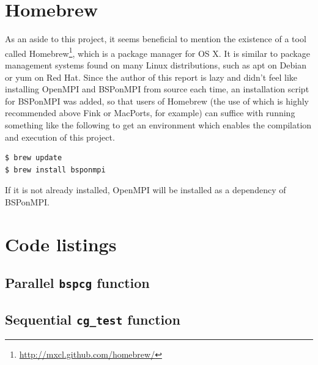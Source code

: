 \documentclass[a4paper]{article}
\begin{document}
\clearpage
\section{Homebrew}

As an aside to this project, it seems beneficial to mention the existence of a
tool called Homebrew\footnote{\url{http://mxcl.github.com/homebrew/}}, which is
a package manager for OS X. It is similar to package management systems found
on many Linux distributions, such as apt on Debian or yum on Red Hat. Since the
author of this report is lazy and didn't feel like installing OpenMPI and
BSPonMPI from source each time, an installation script for BSPonMPI was added,
so that users of Homebrew (the use of which is highly recommended above Fink or MacPorts,
for example) can suffice with running something like the following to get an
environment which enables the compilation and execution of this project.

\begin{verbatim}
$ brew update
$ brew install bsponmpi
\end{verbatim}

If it is not already installed, OpenMPI will be installed as a dependency of BSPonMPI.

\section{Code listings}


\subsection{Parallel \texttt{bspcg} function}\label{sec:par-code}



\subsection{Sequential \texttt{cg\_test} function}\label{sec:seq-code}

\clearpage




\end{document}
